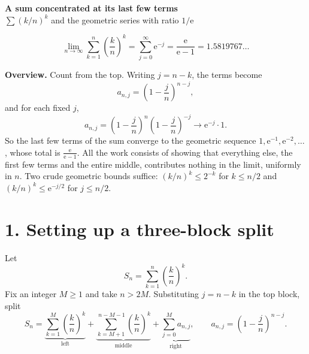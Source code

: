 \documentclass[12pt]{article}
\newcommand{\e}{\mathrm{e}}
\newcommand{\Sn}{S_n}
\begin{document}
\begin{center}
{\Large\bfseries A sum concentrated at its last few terms}\\[0.35em]
{\large \(\sum(k/n)^k\) and the geometric series with ratio \(1/\mathrm e\)}
\end{center}

\[
\boxed{\displaystyle
\lim_{n\to\infty}\sum_{k=1}^{n}\left(\frac kn\right)^k
=\sum_{j=0}^{\infty}\e^{-j}
=\frac{\e}{\e-1}
=1.5819767\ldots}
\]

\textbf{Overview.}
Count from the top. Writing \(j=n-k\), the terms become
\[
a_{n,j}=\left(1-\frac jn\right)^{n-j},
\]
and for each fixed \(j\),
\[
a_{n,j}=\left(1-\frac jn\right)^{n}\left(1-\frac jn\right)^{-j}
\longrightarrow \e^{-j}\cdot1 .
\]
So the last few terms of the sum converge to the geometric sequence
\(1,\e^{-1},\e^{-2},\dots\), whose total is \(\frac{\e}{\e-1}\). All the
work consists of showing that everything else, the first few terms and
the entire middle, contributes nothing in the limit, uniformly in
\(n\). Two crude geometric bounds suffice: \((k/n)^k\le2^{-k}\) for
\(k\le n/2\) and \((k/n)^k\le \e^{-j/2}\) for \(j\le n/2\).

\section*{1. Setting up a three-block split}

Let
\[
\Sn=\sum_{k=1}^{n}\left(\frac kn\right)^k .
\]
Fix an integer \(M\ge1\) and take \(n>2M\). Substituting \(j=n-k\) in the
top block, split
\[
\Sn=
\underbrace{\sum_{k=1}^{M}\left(\frac kn\right)^k}_{\text{left}}
+\underbrace{\sum_{k=M+1}^{\,n-M-1}\left(\frac kn\right)^k}_{\text{middle}}
+\underbrace{\sum_{j=0}^{M}a_{n,j}}_{\text{right}},
\qquad
a_{n,j}=\left(1-\frac jn\right)^{n-j} .
\tag{1}
\]

\begin{center}
\end{center}
\end{document}
